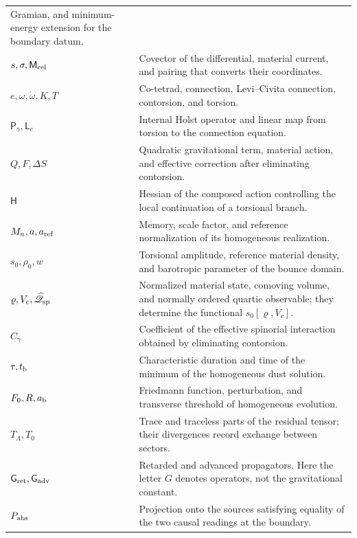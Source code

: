 \begin{longtable}{@{}p{.23\linewidth}p{.72\linewidth}@{}}
Gramian, and minimum-energy extension for the boundary datum.\\
\(s,\sigma,\mathsf M_{\rm cel}\) & Covector of the differential, material
current, and pairing that converts their coordinates.\\
\(e,\omega,\mathring\omega,K,T\) & Co-tetrad, connection,
Levi--Civita connection, contorsion, and torsion.\\
\(\mathsf P_\gamma,\mathsf L_e\) & Internal Holst operator and
linear map from torsion to the connection equation.\\
\(Q,F,\Delta S\) & Quadratic gravitational term, material action,
and effective correction after eliminating contorsion.\\
\(\mathsf H\) & Hessian of the composed action controlling the
local continuation of a torsional branch.\\
\(M_n,a,a_{\rm ref}\) & Memory, scale factor, and reference
normalization of its homogeneous realization.\\
\(s_0,\rho_0,w\) & Torsional amplitude, reference material density,
and barotropic parameter of the bounce domain.\\
\(\varrho,V_c,\widehat{\mathscr Q}_{\rm sp}\) & Normalized material state, comoving
volume, and normally ordered quartic observable; they determine
the functional \(s_0[\varrho,V_c]\).\\
\(C_\gamma\) & Coefficient of the effective spinorial interaction
obtained by eliminating contorsion.\\
\(\tau,t_{\rm b}\) & Characteristic duration and time of the minimum
of the homogeneous dust solution.\\
\(F_0,R,a_{\rm b}\) & Friedmann function, perturbation, and
transverse threshold of homogeneous evolution.\\
\(T_\Lambda,T_0\) & Trace and traceless parts of the residual tensor;
their divergences record exchange between sectors.\\
\(\mathsf{G}_{\rm ret},\mathsf{G}_{\rm adv}\) & Retarded and advanced propagators.
Here the letter \(G\) denotes operators, not the gravitational constant.\\
\(P_{\rm abs}\) & Projection onto the sources satisfying equality
of the two causal readings at the boundary.\\
\bottomrule
\end{longtable}

\par\endgroup
